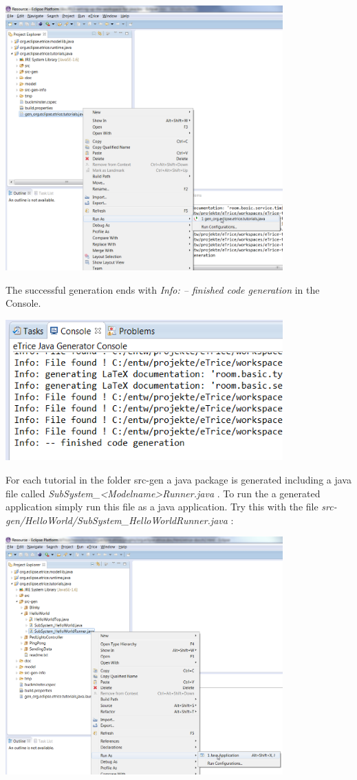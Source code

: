 \includegraphics[width=0.8\textwidth]{images/013-SetupWorkspace05.png}

The successful generation ends with \emph{Info: -- finished code generation} in the Console.

\includegraphics[width=0.8\textwidth]{images/013-SetupWorkspace051.png}


For each tutorial in the folder src-gen a java package is generated including a java file called 
\emph{SubSystem\_<Modelname>Runner.java} . To run the a generated application simply run this file as a java application.
Try this with the file \emph{src-gen/HelloWorld/SubSystem_HelloWorldRunner.java} :

\includegraphics[width=0.8\textwidth]{images/013-SetupWorkspace06.png}

